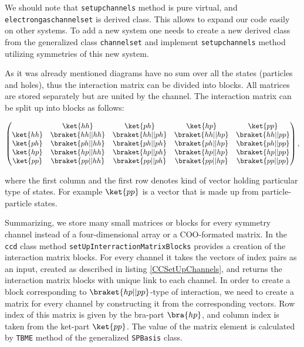 \documentclass[twoside,english]{uiofysmaster}
\newcommand{\classname}[1]{\texttt{#1}}
\begin{document}
We should note that \classname{setupchannels} method is pure virtual, and\\ \classname{electrongaschannelset} is derived class. This allows to expand our code easily on other systems. To add a new system one needs to create a new derived class from the generalized class \classname{channelset} and implement \classname{setupchannels} method utilizing symmetries of this new system.

As it was already mentioned diagrams have no sum over all the states (particles and holes), thus the interaction matrix can be divided into blocks. All matrices are stored separately but are united by the channel. The interaction matrix can be split up into blocks as follows:

\[
\begin{pmatrix} 

         &\ket{hh} & \ket{ph} & \ket{hp} & \ket{pp}   \\
\ket{hh} & \braket{hh||hh} & \braket{hh||ph} & \braket{hh||hp} & \braket{hh||pp} \\
\ket{ph} & \braket{ph||hh} & \braket{ph||ph} & \braket{ph||hp} & \braket{ph||pp} \\
\ket{hp} & \braket{hp||hh} & \braket{hp||ph} & \braket{hp||hp} & \braket{hp||pp} \\
\ket{pp} & \braket{pp||hh} & \braket{pp||ph} & \braket{pp||hp} & \braket{pp||pp} \\

\end{pmatrix},
\]

where the first column and the first row denotes kind of vector holding particular type of states. For example $\ket{pp}$ is a vector that is made up from particle-particle states.

Summarizing, we store many small matrices or blocks for every symmetry channel instead of a four-dimensional array or a COO-formated matrix. 
In the \classname{ccd} class method \classname{setUpInterractionMatrixBlocks} provides a creation of the interaction matrix blocks. For every channel it takes the vectors of index pairs as an input, created as described in listing \ref{CCSetUpChannels}, and returns the interaction matrix blocks with unique link to each channel. In order to create a block corresponding to $\braket{hp||pp}$-type of interaction, we need to create a matrix for every channel by constructing it from the corresponding vectors. Row index of this matrix is given by the bra-part $\bra{hp}$, and column index is taken from the ket-part $\ket{pp}$. The value of the matrix element is calculated by \classname{TBME} method of the generalized \classname{SPBasis} class.
\end{document}

